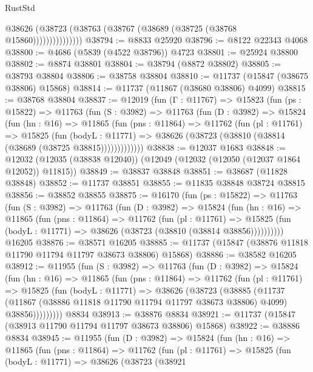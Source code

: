 \begin{lexlean}{RustStd}
\begin{coremodule}
                    @38626 (@38723 (@38763 (@38767 (@38689 (@38725 (@38768 @15860)))))))))))))))
@38794 := @8833 @25920
@38796 := @8122 @22343 @4068
@38800 := @4686 (@5839 (@4522 @38796)) @4723
@38801 := @25924 @38800
@38802 := @8874 @38801
@38804 := @38794 (@8872 @38802)
@38805 := @38793 @38804
@38806 := @38758 @38804
@38810 := @11737 (@15847 (@38675 @38806) @15868)
@38814 := @11737 (@11867 (@38680 @38806) @4099)
@38815 := @38768 @38804
@38837 := @12019
    (fun (Γ : @11767) =>
    @15823
      (fun (ps : @15822) =>
      @11763
        (fun (S : @3982) =>
        @11763
          (fun (D : @3982) =>
          @15824
            (fun (hn : @16) =>
            @11865
              (fun (pns : @11864) =>
              @11762
                (fun (pl : @11761) =>
                @15825
                  (fun (bodyL : @11771) =>
                  @38626 (@38723 (@38810 (@38814 (@38689 (@38725 @38815)))))))))))))
@38838 := @12037 @1683
@38848 := @12032 (@12035 (@38838 @12040)) (@12049 (@12032 (@12050 (@12037 @1864 @12052)) @11815))
@38849 := @38837 @38848
@38851 := @38687 (@11828 @38848)
@38852 := @11737 @38851
@38855 := @11835 @38848 @38724 @38815
@38856 := @38852 @38855
@38875 := @16170
    (fun (ps : @15822) =>
    @11763
      (fun (S : @3982) =>
      @11763
        (fun (D : @3982) =>
        @15824
          (fun (hn : @16) =>
          @11865
            (fun (pns : @11864) =>
            @11762
              (fun (pl : @11761) =>
              @15825 (fun (bodyL : @11771) => @38626 (@38723 (@38810 (@38814 @38856))))))))))
    @16205
@38876 := @38571 @16205
@38885 := @11737 (@15847 (@38876 @11818 @11790 @11794 @11797 @38673 @38806) @15868)
@38886 := @38582 @16205
@38912 := @11955
    (fun (S : @3982) =>
    @11763
      (fun (D : @3982) =>
      @15824
        (fun (hn : @16) =>
        @11865
          (fun (pns : @11864) =>
          @11762
            (fun (pl : @11761) =>
            @15825
              (fun (bodyL : @11771) =>
              @38626
                (@38723
                  (@38885
                    (@11737
                      (@11867 (@38886 @11818 @11790 @11794 @11797 @38673 @38806) @4099)
                      @38856)))))))))
    @8834
@38913 := @38876 @8834
@38921 := @11737 (@15847 (@38913 @11790 @11794 @11797 @38673 @38806) @15868)
@38922 := @38886 @8834
@38945 := @11955
    (fun (D : @3982) =>
    @15824
      (fun (hn : @16) =>
      @11865
        (fun (pns : @11864) =>
        @11762
          (fun (pl : @11761) =>
          @15825
            (fun (bodyL : @11771) =>
            @38626
              (@38723
                (@38921

\end{coremodule}
\end{lexlean}
